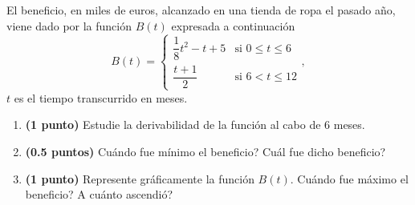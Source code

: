 
El beneficio, en miles de euros, alcanzado en una tienda de ropa el pasado año, viene dado por la función $B(t)$ expresada a continuación
\[
B(t)=\begin{cases}\dfrac{1}{8}t^2-t+5&\text{si }0\leq t\leq6\\[0.8em]\dfrac{t+1}{2}&\text{si }6<t\leq12\end{cases},
\]
$t$ es el tiempo transcurrido en meses.
\begin{enumerate}[label=\alph*)]
\item \textbf{(1 punto)} Estudie la derivabilidad de la función al cabo de 6 meses.
\item \textbf{(0.5 puntos)} \textquestiondown{}Cuándo fue mínimo el beneficio? \textquestiondown{}Cuál fue dicho beneficio?
\item \textbf{(1 punto)} Represente gráficamente la función $B(t)$. \textquestiondown{}Cuándo fue máximo el beneficio? \textquestiondown{}A cuánto ascendió?
\end{enumerate}
